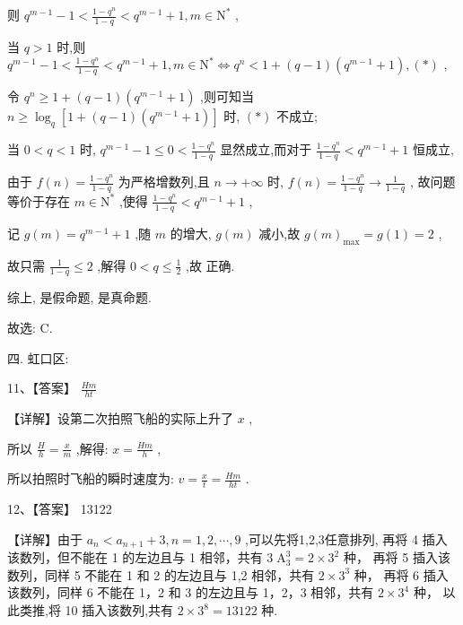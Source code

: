 \documentclass[10pt]{article}
\newcommand*\circled[1]{\tikz[baseline=(char.base)]{\node[shape=circle,draw,inner sep=1.5pt] (char) {\small #1};}}
\begin{document}
则 \({q}^{m - 1} - 1 < \frac{1 - {q}^{n}}{1 - q} < {q}^{m - 1} + 1,m \in  {\mathrm{N}}^{ * }\) ,

当 \(q > 1\) 时,则 \({q}^{m - 1} - 1 < \frac{1 - {q}^{n}}{1 - q} < {q}^{m - 1} + 1,m \in  {\mathrm{N}}^{ * } \Leftrightarrow  {q}^{n} < 1 + \left( {q - 1}\right) \left( {{q}^{m - 1} + 1}\right) ,\left( *\right)\) ,

令 \({q}^{n} \geq  1 + \left( {q - 1}\right) \left( {{q}^{m - 1} + 1}\right)\) ,则可知当 \(n \geq  {\log }_{q}\left\lbrack  {1 + \left( {q - 1}\right) \left( {{q}^{m - 1} + 1}\right) }\right\rbrack\) 时, \(\left( *\right)\) 不成立;

当 \(0 < q < 1\) 时, \({q}^{m - 1} - 1 \leq  0 < \frac{1 - {q}^{n}}{1 - q}\) 显然成立,而对于 \(\frac{1 - {q}^{n}}{1 - q} < {q}^{m - 1} + 1\) 恒成立,

由于 \(f\left( n\right)  = \frac{1 - {q}^{n}}{1 - q}\) 为严格增数列,且 \(n \rightarrow   + \infty\) 时, \(f\left( n\right)  = \frac{1 - {q}^{n}}{1 - q} \rightarrow  \frac{1}{1 - q}\) , 故问题等价于存在 \(m \in  {\mathrm{N}}^{ * }\) ,使得 \(\frac{1 - {q}^{n}}{1 - q} < {q}^{m - 1} + 1\) ,

记 \(g\left( m\right)  = {q}^{m - 1} + 1\) ,随 \(m\) 的增大, \(g\left( m\right)\) 减小,故 \(g{\left( m\right) }_{\max } = g\left( 1\right)  = 2\) ,

故只需 \(\frac{1}{1 - q} \leq  2\) ,解得 \(0 < q \leq  \frac{1}{2}\) ,故 \circled{2} 正确.

综上,  \circled{1} 是假命题,  \circled{2} 是真命题.

故选: C.

四. 虹口区:

11、【答案】 \(\frac{Hm}{ht}\)

【详解】设第二次拍照飞船的实际上升了 \(x\) ,

所以 \(\frac{H}{h} = \frac{x}{m}\) ,解得: \(x = \frac{Hm}{h}\) ,

所以拍照时飞船的瞬时速度为: \(v = \frac{x}{t} = \frac{Hm}{ht}\) .

12、【答案】 13122

【详解】由于 \({a}_{n} < {a}_{n + 1} + 3,n = 1,2,\cdots ,9\) ,可以先将1,2,3任意排列, 再将 4 插入该数列，但不能在 1 的左边且与 1 相邻，共有 \(3{\mathrm{\;A}}_{3}^{3} = 2 \times  {3}^{2}\) 种， 再将 5 插入该数列，同样 5 不能在 1 和 2 的左边且与 1,2 相邻，共有 \(2 \times  {3}^{3}\) 种， 再将 6 插入该数列，同样 6 不能在 1，2 和 3 的左边且与 1，2，3 相邻，共有 \(2 \times  {3}^{4}\) 种， 以此类推,将 10 插入该数列,共有 \(2 \times  {3}^{8} = {13122}\) 种.
\end{document}
